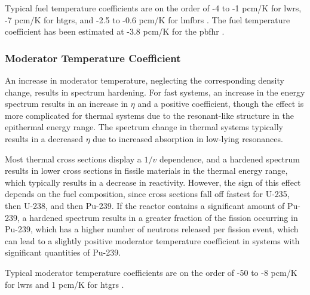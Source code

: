 Typical fuel temperature coefficients are on the order of -4 to -1 pcm/K for \glspl{lwr}, -7 pcm/K for \glspl{htgr}, and -2.5 to -0.6 pcm/K for \glspl{lmfbr} \cite{duderstadt}. The fuel temperature coefficient has been estimated at -3.8 pcm/K for the \gls{pbfhr} \cite{xin_wang_thesis}.

\subsubsection{Moderator Temperature Coefficient}
An increase in moderator temperature, neglecting the corresponding density change, results in spectrum hardening. For fast systems, an increase in the energy spectrum results in an increase in \(\eta\) and a positive coefficient, though the effect is more complicated for thermal systems due to the resonant-like structure in the epithermal energy range. The spectrum change in thermal systems typically results in a decreased \(\eta\) due to increased absorption in low-lying resonances.

Most thermal cross sections display a \(1/v\) dependence, and a hardened spectrum results in lower cross sections in fissile materials in the thermal energy range, which typically results in a decrease in reactivity. However, the sign of this effect depends on the fuel composition, since cross sections fall off fastest for U-235, then U-238, and then Pu-239. If the reactor contains a significant amount of Pu-239, a hardened spectrum results in a greater fraction of the fission occurring in Pu-239, which has a higher number of neutrons released per fission event, which can lead to a slightly positive moderator temperature coefficient in systems with significant quantities of Pu-239. 





Typical moderator temperature coefficients are on the order of -50 to -8 pcm/K for \glspl{lwr} and 1 pcm/K for \glspl{htgr} \cite{duderstadt}. 


